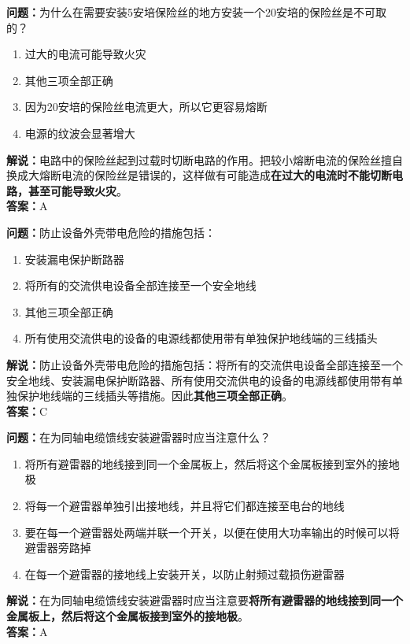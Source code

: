 \bigskip



\noindent\textbf{问题：}为什么在需要安装5安培保险丝的地方安装一个20安培的保险丝是不可取的？
\begin{enumerate}[label=\Alph*), leftmargin=3em]
	\item 过大的电流可能导致火灾
	\item 其他三项全部正确
	\item 因为20安培的保险丝电流更大，所以它更容易熔断
	\item 电源的纹波会显著增大
\end{enumerate}
\noindent\textbf{解说：}电路中的保险丝起到过载时切断电路的作用。把较小熔断电流的保险丝擅自换成大熔断电流的保险丝是错误的，这样做有可能造成\textbf{在过大的电流时不能切断电路，甚至可能导致火灾}。\\\noindent\textbf{答案：}A


\bigskip



\noindent\textbf{问题：}防止设备外壳带电危险的措施包括：
\begin{enumerate}[label=\Alph*), leftmargin=3em]
	\item 安装漏电保护断路器
	\item 将所有的交流供电设备全部连接至一个安全地线
	\item 其他三项全部正确
	\item 所有使用交流供电的设备的电源线都使用带有单独保护地线端的三线插头
\end{enumerate}
\noindent\textbf{解说：}防止设备外壳带电危险的措施包括：将所有的交流供电设备全部连接至一个安全地线、安装漏电保护断路器、所有使用交流供电的设备的电源线都使用带有单独保护地线端的三线插头等措施。因此\textbf{其他三项全部正确}。\\\noindent\textbf{答案：}C


\bigskip



\noindent\textbf{问题：}在为同轴电缆馈线安装避雷器时应当注意什么？
\begin{enumerate}[label=\Alph*), leftmargin=3em]
	\item 将所有避雷器的地线接到同一个金属板上，然后将这个金属板接到室外的接地极
	\item 将每一个避雷器单独引出接地线，并且将它们都连接至电台的地线
	\item 要在每一个避雷器处两端并联一个开关，以便在使用大功率输出的时候可以将避雷器旁路掉
	\item 在每一个避雷器的接地线上安装开关，以防止射频过载损伤避雷器
\end{enumerate}
\noindent\textbf{解说：}在为同轴电缆馈线安装避雷器时应当注意要\textbf{将所有避雷器的地线接到同一个金属板上，然后将这个金属板接到室外的接地极}。\\\noindent\textbf{答案：}A


